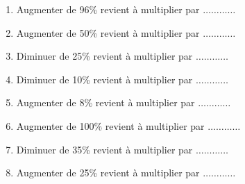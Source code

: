 
\begin{enumerate}
\item Augmenter de 96\% revient à multiplier par $\ldots \ldots \ldots \ldots$
\item Augmenter de 50\% revient à multiplier par $\ldots \ldots \ldots \ldots$
\item Diminuer de 25\% revient à multiplier par $\ldots \ldots \ldots \ldots$
\item Diminuer de 10\% revient à multiplier par $\ldots \ldots \ldots \ldots$
\item Augmenter de 8\% revient à multiplier par $\ldots \ldots \ldots \ldots$
\item Augmenter de 100\% revient à multiplier par $\ldots \ldots \ldots \ldots$
\item Diminuer de 35\% revient à multiplier par $\ldots \ldots \ldots \ldots$
\item Augmenter de 25\% revient à multiplier par $\ldots \ldots \ldots \ldots$
\end{enumerate}